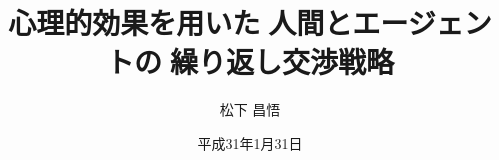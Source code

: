 \usepackage{gra_yasuda}
\usepackage{lscape}
\usepackage{graphicx}
\usepackage{here}
\usepackage{color}
\usepackage{amsmath}
\usepackage{subfig}
\usepackage{tascmac}
\usepackage{url}
\usepackage{ascmac}
\usepackage{booktabs}
\usepackage{otf}
\usepackage{comment}
\usepackage{url}

\renewcommand\UrlFont{\rmfamily}
\DeclareMathOperator*{\argmin}{arg\,min}
\DeclareMathOperator*{\argmax}{arg\,max}



\title{心理的効果を用いた人間とエージェントの繰り返し交渉戦略}

\author{松下 昌悟}



\date{平成31年1月31日}



\setlength{\baselineskip}{8truemm}
